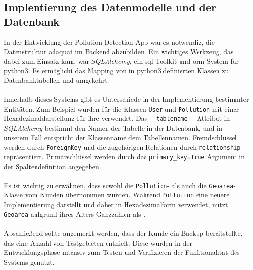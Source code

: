 \documentclass[a4paper,12pt]{article}
\begin{document}
\subsection{Implentierung des Datenmodelle und der Datenbank}
In der Entwicklung der \glqq Pollution Detection\grqq{}-App war es notwendig, die Datenstruktur adäquat im Backend abzubilden. Ein wichtiges Werkzeug, das dabei zum Einsatz kam, war \textit{SQLAlchemy}, ein \acrshort{sql} Toolkit und \gls{orm} System für \acrshort{python3}. Es ermöglicht das Mapping von in \acrshort{python3} definierten Klassen zu Datenbanktabellen und umgekehrt.\\
\\
Innerhalb dieses Systems gibt es Unterschiede in der Implementierung bestimmter Entitäten. Zum Beispiel wurden für die Klassen \texttt{User} und \texttt{Pollution}  mit einer Hexadezimaldarstellung für ihre  verwendet. Das \texttt{\_\_tablename\_\_}-Attribut in \textit{SQLAlchemy} bestimmt den Namen der Tabelle in der Datenbank, und in unserem Fall entspricht der Klassenname dem Tabellennamen. Fremdschlüssel werden durch \texttt{ForeignKey} und die zugehörigen Relationen durch \texttt{relationship} repräsentiert. Primärschlüssel werden durch das \texttt{primary\_key=True} Argument in der Spaltendefinition angegeben.\\
\\
Es ist wichtig zu erwähnen, dass sowohl die \texttt{Pollution}- als auch die \texttt{Geoarea}-Klasse vom Kunden übernommen wurden. Während \texttt{Pollution} eine neuere Implementierung darstellt und daher  in Hexadezimalform verwendet, nutzt \texttt{Geoarea} aufgrund ihres Alters Ganzzahlen als . \\
\\
Abschließend sollte angemerkt werden, dass der Kunde ein Backup bereitstellte, das eine Anzahl von Testgebieten enthielt. Diese wurden in der Entwicklungsphase intensiv zum Testen und Verifizieren der Funktionalität des Systems genutzt.
\end{document}
